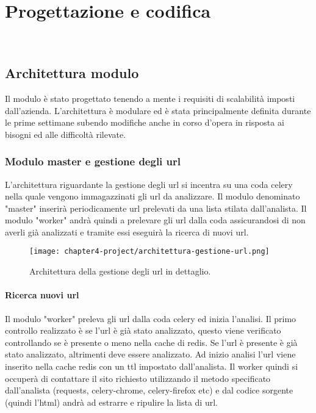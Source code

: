 
\chapter{Progettazione e codifica}
\label{cap:progettazione-codifica}

\\

\section{Architettura modulo}

Il modulo è stato progettato tenendo a mente i requisiti di scalabilità imposti dall'azienda. L'architettura è modulare ed è stata principalmente definita durante le prime settimane subendo modifiche anche in corso d'opera in risposta ai bisogni ed alle difficoltà rilevate.

\subsection{Modulo master e gestione degli url}

L'architettura riguardante la gestione degli url si incentra su una coda celery nella quale vengono immagazzinati gli url da analizzare. Il modulo denominato "master" inserirà periodicamente url prelevati da una lista stilata dall'analista. Il modulo "worker" andrà quindi a prelevare gli url dalla coda assicurandosi di non averli già analizzati e tramite essi eseguirà la ricerca di nuovi url. 


\begin{figure}[!h] 
    \centering 
    \texttt{[image: chapter4-project/architettura-gestione-url.png]} 
    \caption{Architettura della gestione degli url in dettaglio.}
\end{figure}

\subsubsection{Ricerca nuovi url}

Il modulo "worker" preleva gli url dalla coda celery ed inizia l'analisi. Il primo controllo realizzato è se l'url è già stato analizzato, questo viene verificato controllando se è presente o meno nella cache di redis. Se l'url è presente è già stato analizzato, altrimenti deve essere analizzato. Ad inizio analisi l'url viene inserito nella cache redis con un ttl impostato dall'analista. Il worker quindi si occuperà di contattare il sito richiesto utilizzando il metodo specificato dall'analista (requests, celery-chrome, celery-firefox etc) e dal codice sorgente (quindi l'html) andrà ad estrarre e ripulire la lista di url. 


